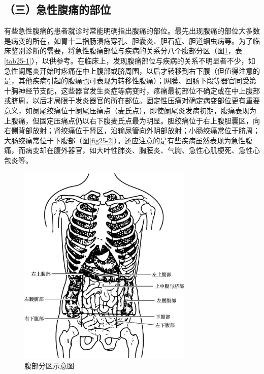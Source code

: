 \subsection{（三）急性腹痛的部位}

有些急性腹痛的患者就诊时常能明确指出腹痛的部位。最先出现腹痛的部位大多数是病变的所在，如胃十二指肠溃疡穿孔、胆囊炎、胆石症、胆道蛔虫病等。为了临床鉴别诊断的需要，将急性腹痛部位与疾病的关系分八个腹部分区（图\ref{fig25-1}，表\ref{tab25-1}），以供参考。在临床上，发现腹痛部位与疾病的关系不明显者不少，如急性阑尾炎开始时疼痛在中上腹部或脐周围，以后才转移到右下腹（但值得注意的是，其他疾病引起的腹痛也可表现为转移性腹痛）；网膜、回肠下段等器官同受第十胸神经节支配，这些器官发生炎症等病变时，疼痛最初部位不确定或在中上腹部或脐周，以后才局限于发炎器官的所在部位。固定性压痛对确定病变部位更有重要意义，如阑尾绞痛位于阑尾压痛点（麦氏点），即使阑尾炎发病初期，腹痛表现为上腹痛，但固定压痛点仍以右下腹麦氏点最为明显。胆绞痛位于右上腹胆囊区，向右侧背部放射；肾绞痛位于肾区，沿输尿管向外阴部放射；小肠绞痛常位于脐周；大肠绞痛常位于下腹部（图\ref{fig25-2}）。还应注意的是有些疾病虽然表现为急性腹痛，而病变却在腹外器官，如大叶性肺炎、胸膜炎、气胸、急性心肌梗死、急性心包炎等。

\begin{figure}[!htbp]
 \centering
 \includegraphics[width=3.27083in,height=3.8125in]{./images/Image00136.jpg}
 \captionsetup{justification=centering}
 \caption{腹部分区示意图}
 \label{fig25-1}
  \end{figure} 

